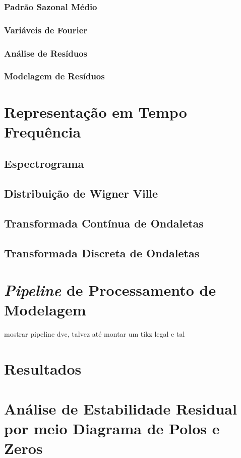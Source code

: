 \subsubsection{Padrão Sazonal Médio}

\subsubsection{Variáveis de Fourier}

\subsubsection{Análise de Resíduos}

\subsubsection{Modelagem de Resíduos}

\section{Representação em Tempo Frequência}

\subsection{Espectrograma}

\subsection{Distribuição de Wigner Ville}

\subsection{Transformada Contínua de Ondaletas}

\subsection{Transformada Discreta de Ondaletas}

\section{\emph{Pipeline} de Processamento de Modelagem}

mostrar pipeline dvc, talvez até montar um tikz legal e tal

\section{Resultados}

\section{Análise de Estabilidade Residual por meio Diagrama de Polos e Zeros}
